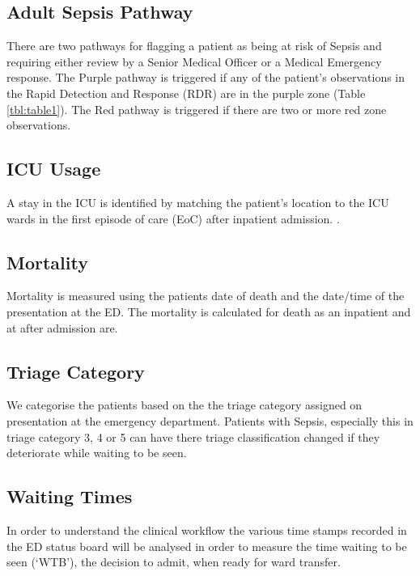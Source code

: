 \documentclass[
  a4paper,
  ,captions=tableheading
]{scrartcl}
\begin{document}
\subsection{Adult Sepsis Pathway}\label{adult-sepsis-pathway}

There are two pathways for flagging a patient as being at risk of Sepsis
and requiring either review by a Senior Medical Officer or a Medical
Emergency response. The Purple pathway is triggered if any of the
patient's observations in the Rapid Detection and Response (RDR) are in
the purple zone (Table \ref{tbl:table1}). The Red pathway is triggered
if there are two or more red zone observations.

\subsection{ICU Usage}\label{icu-usage}

A stay in the ICU is identified by matching the patient's location to
the ICU wards in the first episode of care (EoC) after inpatient
admission. .

\subsection{Mortality}\label{mortality}

Mortality is measured using the patients date of death and the date/time
of the presentation at the ED. The mortality is calculated for death as
an inpatient and at after admission are.

\subsection{Triage Category}\label{triage-category}

We categorise the patients based on the the triage category assigned on
presentation at the emergency department. Patients with Sepsis,
especially this in triage category 3, 4 or 5 can have there triage
classification changed if they deteriorate while waiting to be seen.

\subsection{Waiting Times}\label{waiting-times}

In order to understand the clinical workflow the various time stamps
recorded in the ED status board will be analysed in order to measure the
time waiting to be seen (`WTB'), the decision to admit, when ready for
ward transfer.
\end{document}
